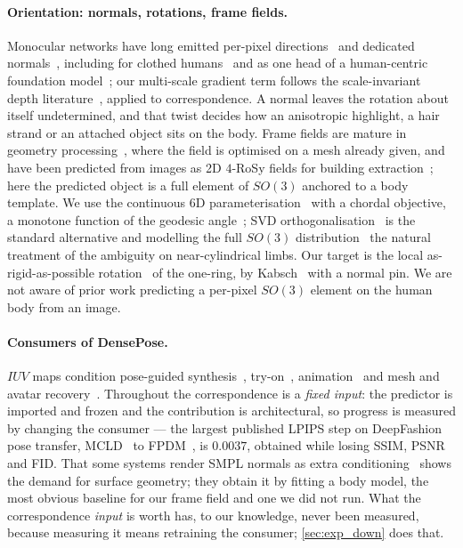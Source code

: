 \paragraph{Orientation: normals, rotations, frame fields.}
Monocular networks have long emitted per-pixel directions~\cite{eigen2015multiscale} and dedicated
normals~\cite{bae2021nll,bae2024dsine}, including for clothed
humans~\cite{saito2020pifuhd,xiu2022icon} and as one head of a human-centric foundation
model~\cite{khirodkar2024sapiens}; our multi-scale gradient term follows the scale-invariant depth
literature~\cite{eigen2015multiscale,li2018megadepth,ranftl2020midas}, applied to correspondence. A
normal leaves the rotation about itself undetermined, and that twist decides how an anisotropic
highlight, a hair strand or an attached object sits on the body. Frame fields are mature in geometry
processing~\cite{ray2008nsym,bommes2009miq,knoppel2013direction,vaxman2016directional}, where the
field is optimised on a mesh already given, and have been predicted from images as 2D $4$-RoSy
fields for building extraction~\cite{girard2021framefield}; here the predicted object is a full
element of $SO(3)$ anchored to a body template. We use the continuous 6D
parameterisation~\cite{zhou2019continuity} with a chordal objective, a monotone function of the
geodesic angle~\cite{huynh2009metrics}; SVD orthogonalisation~\cite{levinson2020svd} is the
standard alternative and modelling the full $SO(3)$ distribution~\cite{murphy2021ipdf} the natural
treatment of the ambiguity on near-cylindrical limbs. Our target is the local as-rigid-as-possible
rotation~\cite{sorkine2007arap} of the one-ring, by Kabsch~\cite{kabsch1976} with a normal pin. We
are not aware of prior work predicting a per-pixel $SO(3)$ element on the human body from an image.

\paragraph{Consumers of DensePose.}
$IUV$ maps condition pose-guided
synthesis~\cite{neverova2018dpt,ren2022nted,zhou2022casd,pidm2023,shen2024pcdm,cfld2024,pham2024xmdpt,mcld2025,fpdm2024,leffa2025},
try-on~\cite{choi2021vitonhd,kim2024stableviton,choi2024idmvton},
animation~\cite{xu2024magicanimate,zhu2024champ} and mesh and avatar
recovery~\cite{guler2019holopose,xu2019denserac,zeng2020decomr,shysheya2019tna}. Throughout the
correspondence is a \emph{fixed input}: the predictor is imported and frozen and the contribution
is architectural, so progress is measured by changing the consumer --- the largest published LPIPS
step on DeepFashion pose transfer, MCLD~\cite{mcld2025} to FPDM~\cite{fpdm2024}, is $0.0037$,
obtained while losing SSIM, PSNR and FID. That some systems render SMPL normals as extra
conditioning~\cite{zhu2024champ} shows the demand for surface geometry; they obtain it by fitting a
body model, the most obvious baseline for our frame field and one we did not run. What the
correspondence \emph{input} is worth has, to our knowledge, never been measured, because measuring
it means retraining the consumer; \cref{sec:exp_down} does that.
